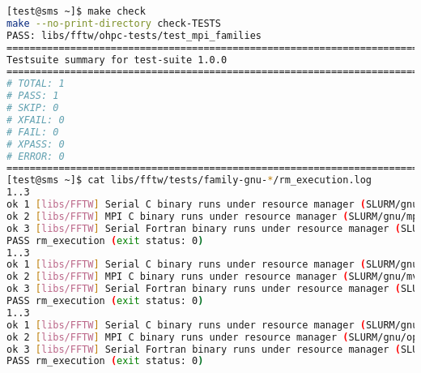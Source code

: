 \begin{lstlisting}[language=bash,keywords={},upquote=true]
[test@sms ~]$ make check 
make --no-print-directory check-TESTS 
PASS: libs/fftw/ohpc-tests/test_mpi_families
============================================================================ 
Testsuite summary for test-suite 1.0.0
============================================================================ 
# TOTAL: 1 
# PASS: 1 
# SKIP: 0 
# XFAIL: 0 
# FAIL: 0 
# XPASS: 0 
# ERROR: 0 
============================================================================ 
[test@sms ~]$ cat libs/fftw/tests/family-gnu-*/rm_execution.log 
1..3 
ok 1 [libs/FFTW] Serial C binary runs under resource manager (SLURM/gnu/mpich) 
ok 2 [libs/FFTW] MPI C binary runs under resource manager (SLURM/gnu/mpich) 
ok 3 [libs/FFTW] Serial Fortran binary runs under resource manager (SLURM/gnu/mpich) 
PASS rm_execution (exit status: 0) 
1..3 
ok 1 [libs/FFTW] Serial C binary runs under resource manager (SLURM/gnu/mvapich2) 
ok 2 [libs/FFTW] MPI C binary runs under resource manager (SLURM/gnu/mvapich2) 
ok 3 [libs/FFTW] Serial Fortran binary runs under resource manager (SLURM/gnu/mvapich2) 
PASS rm_execution (exit status: 0) 
1..3 
ok 1 [libs/FFTW] Serial C binary runs under resource manager (SLURM/gnu/openmpi) 
ok 2 [libs/FFTW] MPI C binary runs under resource manager (SLURM/gnu/openmpi) 
ok 3 [libs/FFTW] Serial Fortran binary runs under resource manager (SLURM/gnu/openmpi) 
PASS rm_execution (exit status: 0)
\end{lstlisting}
